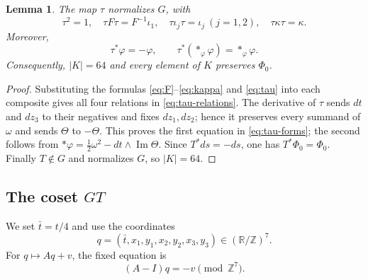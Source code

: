 \documentclass[11pt]{article}
\newtheorem{lemma}[theorem]{Lemma}
\theoremstyle{remark}\newtheorem{remark}[theorem]{Remark}
\newcommand{\R}{\mathbb R}
\newcommand{\Z}{\mathbb Z}
\begin{document}
\begin{lemma}\label{lem:normalization}
The map $\tau$ normalizes $G$, with
\begin{equation}\label{eq:tau-relations}
\tau^2=1,\quad \tau F\tau=F^{-1}\iota _1,\quad
\tau\iota_j\tau=\iota_j\ (j=1,2),\quad \tau\kappa\tau=\kappa.
\end{equation}
Moreover,
\begin{equation}\label{eq:tau-forms}
\tau^*\varphi=-\varphi,\qquad
\tau^*(*_{\varphi}\varphi)=*_{\varphi}\varphi.
\end{equation}
Consequently, $|K|=64$ and every element of $K$ preserves $\Phi_0$.
\end{lemma}
\begin{proof}
Substituting the formulas \eqref{eq:F}--\eqref{eq:kappa} and
\eqref{eq:tau} into each composite gives all four relations in
\eqref{eq:tau-relations}.  The derivative of $\tau$ sends $dt$ and $dz_3$
to their negatives and fixes $dz_1,dz_2$; hence it preserves every summand
of $\omega$ and sends $\Theta$ to $-\Theta$.  This proves the first equation in
\eqref{eq:tau-forms}; the second follows from
$*\varphi=\frac12\omega^2-dt\wedge\operatorname{Im}\Theta$.  Since
$T^*ds=-ds$, one has $T^*\Phi_0=\Phi_0$.  Finally $T\notin G$ and normalizes
$G$, so $|K|=64$.
\end{proof}

\subsection{The coset \texorpdfstring{$GT$}{GT}}
We set $\bar t=t/4$ and use the coordinates
\begin{equation}\label{eq:seven-coordinates}
q=(\bar t,x_1,y_1,x_2,y_2,x_3,y_3)\in(\R/\Z)^7.
\end{equation}
For $q\mapsto Aq+v$, the fixed equation is
\begin{equation}\label{eq:fixed-equation}(A-I)q=-v\pmod{\Z^7}.\end{equation}
\end{document}

